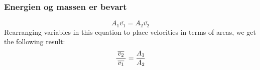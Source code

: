 \documentclass{beamer}
\begin{document}
%
%
\begin{frame}
	\frametitle{Energien og massen er bevart}

	
$$A_1 \overline{v_1} = A_2 \overline{v_2}$$
%
Rearranging variables in this equation to place velocities in terms of areas, we get the following result:
%
$${\> \overline{v_2} \> \over \> \overline{v_1} \>} = {A_1 \over A_2}$$

\end{frame}
\end{document}

